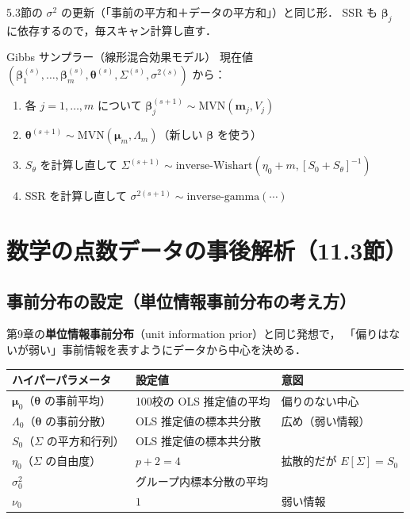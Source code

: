\documentclass[lualatex,ja=standard,a4paper,12pt]{bxjsarticle}
\newcommand{\mvn}{\mathrm{MVN}}
\newcommand{\IW}{\mathrm{inverse\text{-}Wishart}}
\newcommand{\IG}{\mathrm{inverse\text{-}gamma}}
\begin{document}
\noindent 5.3節の $\sigma^2$ の更新（「事前の平方和＋データの平方和」）と同じ形．
SSR も $\bm{\beta}_j$ に依存するので，毎スキャン計算し直す．

\begin{algobox}{Gibbs サンプラー（線形混合効果モデル）}
現在値 $(\bm{\beta}_1^{(s)}, \ldots, \bm{\beta}_m^{(s)}, \bm{\theta}^{(s)}, \Sigma^{(s)}, \sigma^{2(s)})$ から：
\begin{enumerate}
  \item 各 $j = 1, \ldots, m$ について $\bm{\beta}_j^{(s+1)} \sim \mvn(\bm{m}_j, V_j)$
  \item $\bm{\theta}^{(s+1)} \sim \mvn(\bm{\mu}_m, \Lambda_m)$（新しい $\bm{\beta}$ を使う）
  \item $S_\theta$ を計算し直して $\Sigma^{(s+1)} \sim \IW(\eta_0 + m, [S_0 + S_\theta]^{-1})$
  \item SSR を計算し直して $\sigma^{2(s+1)} \sim \IG(\cdots)$
\end{enumerate}
\end{algobox}

\section{数学の点数データの事後解析（11.3節）}

\subsection{事前分布の設定（単位情報事前分布の考え方）}

第9章の\textbf{単位情報事前分布}（unit information prior）と同じ発想で，
「偏りはないが弱い」事前情報を表すようにデータから中心を決める．

\begin{center}
\renewcommand{\arraystretch}{1.5}
\begin{tabular}{lll}
\toprule
ハイパーパラメータ & 設定値 & 意図 \\
\midrule
$\bm{\mu}_0$（$\bm{\theta}$ の事前平均） & 100校の OLS 推定値の平均 & 偏りのない中心 \\
$\Lambda_0$（$\bm{\theta}$ の事前分散） & OLS 推定値の標本共分散 & 広め（弱い情報） \\
$S_0$（$\Sigma$ の平方和行列） & OLS 推定値の標本共分散 & \\
$\eta_0$（$\Sigma$ の自由度） & $p + 2 = 4$ & 拡散的だが $E[\Sigma] = S_0$ \\
$\sigma_0^2$ & グループ内標本分散の平均 & \\
$\nu_0$ & $1$ & 弱い情報 \\
\bottomrule
\end{tabular}
\end{center}
\end{document}
